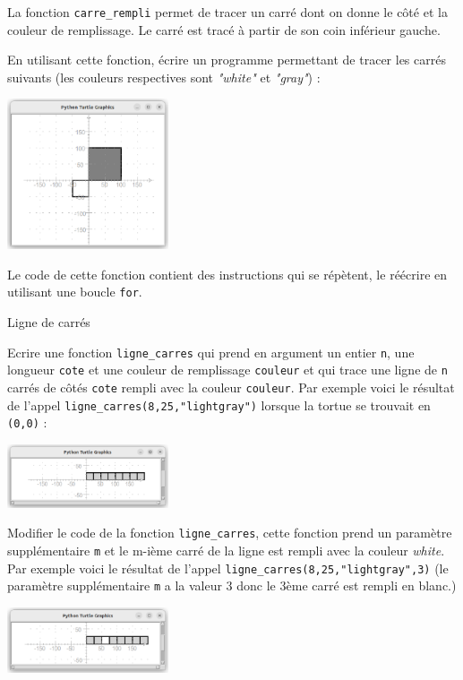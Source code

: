 \documentclass[11pt,a4paper]{article}
\begin{document}
\QListe
\item La fonction {\tt carre\_rempli} permet de tracer un carré dont on donne le côté et la couleur de remplissage. Le carré est tracé à partir de son coin inférieur gauche.
    \SQListe
        \item En utilisant cette fonction, écrire un programme permettant de tracer les carrés suivants (les couleurs respectives sont \textit{"white"} et \textit{"gray"}) : 
        \begin{center}\includegraphics[width=180px]{ipt1-1.eps}\end{center}
        \item Le code de cette fonction contient des instructions qui se répètent, le réécrire en utilisant une boucle {\tt for}. 
    \FinListe
\item Ligne de carrés
    \SQListe
        \item Ecrire une fonction {\tt ligne\_carres} qui prend en argument un entier {\tt n}, une longueur {\tt cote} et une couleur de remplissage {\tt couleur} et qui trace une ligne de {\tt n} carrés de côtés {\tt cote} rempli avec la couleur {\tt couleur}. Par exemple voici le résultat de l'appel {\tt ligne\_carres(8,25,"lightgray")} lorsque la tortue se trouvait en {\tt (0,0)} :
        \begin{center}\includegraphics[width=180px]{ipt1-2.eps}\end{center}
        \item Modifier le code de la fonction {\tt ligne\_carres}, cette fonction prend un paramètre supplémentaire {\tt m} et le m-ième carré de la ligne est rempli avec la couleur \textit{white}. Par exemple voici le résultat de l'appel {\tt ligne\_carres(8,25,"lightgray",3)} (le paramètre supplémentaire {\tt m} a la valeur 3 donc le 3ème carré est rempli en blanc.)
        \begin{center}\includegraphics[width=180px]{ipt1-3.eps}\end{center}
\end{document}
